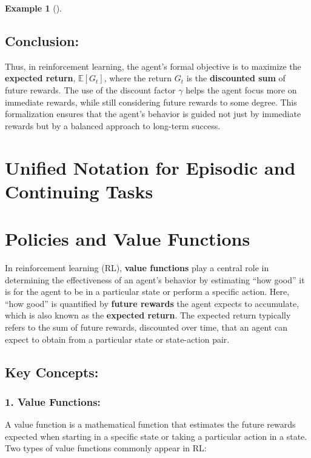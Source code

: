 \documentclass[
  letterpaper,
]{krantz}
\theoremstyle{plain}
\theoremstyle{definition}
\newtheorem{example}{Example}[chapter]
\theoremstyle{definition}
\theoremstyle{remark}
\begin{document}
\begin{example}[]
\subsection{Conclusion:}\label{conclusion}

Thus, in reinforcement learning, the agent's formal objective is to
maximize the \textbf{expected return}, \(\mathbb{E}[G_t]\), where the
return \(G_t\) is the \textbf{discounted sum} of future rewards. The use
of the discount factor \(\gamma\) helps the agent focus more on
immediate rewards, while still considering future rewards to some
degree. This formalization ensures that the agent's behavior is guided
not just by immediate rewards but by a balanced approach to long-term
success.

\section{Unified Notation for Episodic and Continuing
Tasks}\label{unified-notation-for-episodic-and-continuing-tasks}

\section{Policies and Value
Functions}\label{policies-and-value-functions}

In reinforcement learning (RL), \textbf{value functions} play a central
role in determining the effectiveness of an agent's behavior by
estimating ``how good'' it is for the agent to be in a particular state
or perform a specific action. Here, ``how good'' is quantified by
\textbf{future rewards} the agent expects to accumulate, which is also
known as the \textbf{expected return}. The expected return typically
refers to the sum of future rewards, discounted over time, that an agent
can expect to obtain from a particular state or state-action pair.

\subsection{Key Concepts:}\label{key-concepts}

\subsubsection{1. Value Functions:}\label{value-functions}

A value function is a mathematical function that estimates the future
rewards expected when starting in a specific state or taking a
particular action in a state. Two types of value functions commonly
appear in RL:


\end{example}
\end{document}
